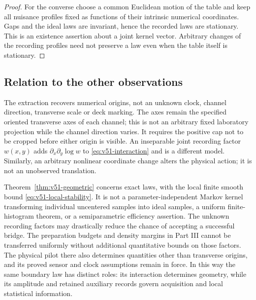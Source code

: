 \begin{proof}
For the converse choose a common Euclidean motion of the table and keep
all nuisance profiles fixed as functions of their intrinsic numerical
coordinates.  Gaps and the ideal laws are invariant, hence the recorded
laws are stationary.  This is an existence assertion about a joint kernel
vector.  Arbitrary changes of the recording profiles need not preserve
a law even when the table itself is stationary.
\end{proof}

\subsection{Relation to the other observations}

The extraction recovers numerical origins, not an unknown clock, channel
direction, transverse scale or deck marking.  The axes remain the specified
oriented transverse axes of each channel; this is not an arbitrary fixed
laboratory projection while the channel direction varies.  It requires the positive cap
not to be cropped before either origin is visible.  An inseparable joint
recording factor $w(x,y)$ adds $\partial_x\partial_y\log w$ to
\eqref{eq:v51-interaction} and is a different model.  Similarly, an arbitrary
nonlinear coordinate change alters the physical action; it is not an
unobserved translation.

Theorem~\ref{thm:v51-geometric} concerns exact laws, with the local finite
smooth bound \eqref{eq:v51-local-stability}.  It is not a parameter-independent
Markov kernel transforming individual uncentered samples into ideal samples,
a uniform finite-histogram theorem, or a semiparametric efficiency assertion.
The unknown recording factors may drastically reduce the chance of accepting
a successful bridge.  The preparation budgets and density margins in
Part III cannot be transferred uniformly without additional quantitative
bounds on those factors.  The physical pilot there also determines quantities
other than transverse origins, and its proved sensor and clock assumptions
remain in force.  In this way the same boundary law has distinct roles:
its interaction determines geometry, while its amplitude and retained
auxiliary records govern acquisition and local statistical information.
